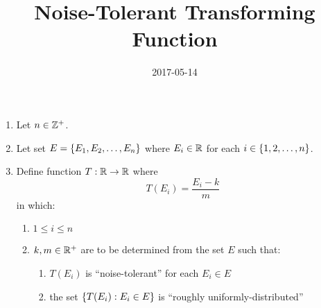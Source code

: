 \documentclass[12pt]{extarticle}
\title{Noise-Tolerant Transforming Function}
\author{}
\date{2017-05-14}
\begin{document}
\maketitle
\thispagestyle{fancy}


\begin{enumerate}
\item Let $n \in \mathbb{Z}^+$.
\item Let set $E = \left\{ E_1, E_2, \ldots, E_n \right\}$
  where $E_i \in \mathbb{R}$ for each $i \in \left\{ 1, 2, \ldots, n \right\}$.
\item Define function $T: \mathbb{R} \to \mathbb{R}$ where
  $$T(E_i) = \frac{E_i - k}{m}$$
  in which:
  \begin{enumerate}
  \item $1 \le i \le n$
  \item $k, m \in \mathbb{R}^+$ are to be determined
    from the set $E$ such that:
    \begin{enumerate}
    \item $T(E_i)$ is ``noise-tolerant'' for each $E_i \in E$
    \item the set $\left\{ T(E_i) : E_i \in E \right\}$
      is ``roughly uniformly-distributed''
    \end{enumerate}
  \end{enumerate}
\end{enumerate}

\cite[page 5/7, equation (5)]{article}



\end{document}
